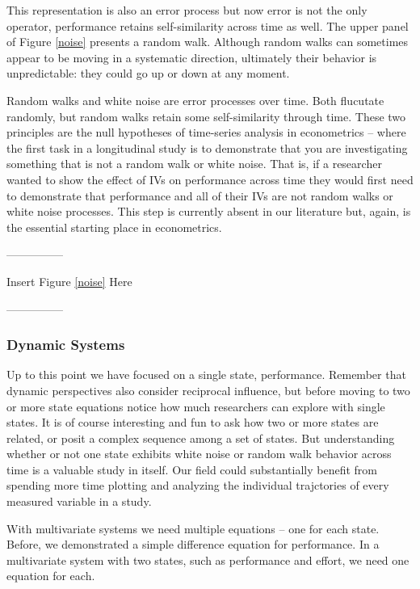 \documentclass[english,,man]{apa6}
\theoremstyle{definition}
\theoremstyle{definition}
\theoremstyle{definition}
\theoremstyle{remark}
\begin{document}
\noindent This representation is also an error process but now error is
not the only operator, performance retains self-similarity across time
as well. The upper panel of Figure \ref{noise} presents a random walk.
Although random walks can sometimes appear to be moving in a systematic
direction, ultimately their behavior is unpredictable: they could go up
or down at any moment.

Random walks and white noise are error processes over time. Both
flucutate randomly, but random walks retain some self-similarity through
time. These two principles are the null hypotheses of time-series
analysis in econometrics -- where the first task in a longitudinal study
is to demonstrate that you are investigating something that is not a
random walk or white noise. That is, if a researcher wanted to show the
effect of IVs on performance across time they would first need to
demonstrate that performance and all of their IVs are not random walks
or white noise processes. This step is currently absent in our
literature but, again, is the essential starting place in econometrics.

\begin{center}

---------------

Insert Figure \ref{noise} Here

---------------

\end{center}

\hypertarget{dynamic-systems}{%
\subsubsection{Dynamic Systems}\label{dynamic-systems}}

Up to this point we have focused on a single state, performance.
Remember that dynamic perspectives also consider reciprocal influence,
but before moving to two or more state equations notice how much
researchers can explore with single states. It is of course interesting
and fun to ask how two or more states are related, or posit a complex
sequence among a set of states. But understanding whether or not one
state exhibits white noise or random walk behavior across time is a
valuable study in itself. Our field could substantially benefit from
spending more time plotting and analyzing the individual trajctories of
every measured variable in a study.

With multivariate systems we need multiple equations -- one for each
state. Before, we demonstrated a simple difference equation for
performance. In a multivariate system with two states, such as
performance and effort, we need one equation for each.
\end{document}
